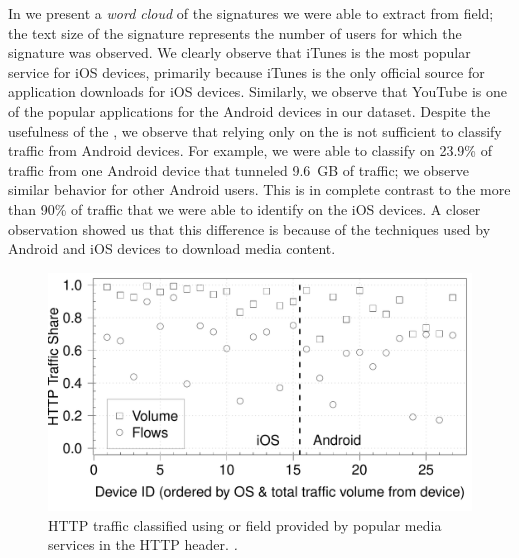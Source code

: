 In  we present a \emph{word cloud} of the
signatures we were able to extract from \useragent field; the text
size of the signature represents the number of users for which the
signature was observed.  We clearly observe that iTunes is the most
popular service for iOS devices, primarily because iTunes is the only
official source for application downloads for iOS devices.  Similarly,
we observe that YouTube is one of the popular applications for the
Android devices in our dataset.  Despite the usefulness of the
\useragent, we observe that relying only on the \useragent is not
sufficient to classify traffic from Android devices.  For example, we
were able to classify on 23.9\% of traffic from one Android device
that tunneled 9.6~GB of traffic; we observe similar behavior for other
Android users.  This is in complete contrast to the more than 90\% of
traffic that we were able to identify on the iOS devices.  A closer
observation showed us that this difference is because of the
techniques used by Android and iOS devices to download media content.

\begin{figure}
\includegraphics[width=\columnwidth]{plots/appusage_someappservicesig_traffic.pdf}
\caption{HTTP traffic classified using \useragent or \httphost field
  provided by popular media services in the HTTP
  header. \emph{.}}
\label{fig:http-classification-app-user-agent-host}
\end{figure}

